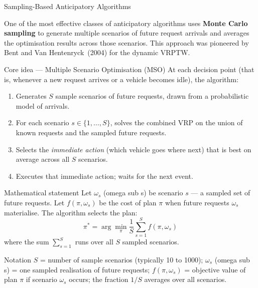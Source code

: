 \documentclass[aspectratio=169,10pt]{beamer}
\begin{document}
\begin{frame}[allowframebreaks]{Sampling-Based Anticipatory Algorithms}

  One of the most effective classes of anticipatory algorithms uses
  \textbf{Monte Carlo sampling} to generate multiple scenarios of future
  request arrivals and averages the optimisation results across those scenarios.
  This approach was pioneered by Bent and Van Hentenryck~(2004) for the
  dynamic VRPTW.

  \begin{block}{Core idea — Multiple Scenario Optimisation (MSO)}
    At each decision point (that is, whenever a new request arrives or a
    vehicle becomes idle), the algorithm:
    \begin{enumerate}
      \item Generates $S$ sample scenarios of future requests, drawn from
            a probabilistic model of arrivals.
      \item For each scenario $s \in \{1, \ldots, S\}$, solves the combined
            VRP on the union of known requests and the sampled future requests.
      \item Selects the \emph{immediate action} (which vehicle goes where next)
            that is best on average across all $S$ scenarios.
      \item Executes that immediate action; waits for the next event.
    \end{enumerate}
  \end{block}

  \begin{block}{Mathematical statement}
    Let $\omega_s$ (omega sub s) be scenario $s$ — a sampled set of future
    requests.  Let $f(\pi, \omega_s)$ be the cost of plan $\pi$ when future
    requests $\omega_s$ materialise.  The algorithm selects the plan:
    \[
      \pi^* = \arg\min_{\pi} \frac{1}{S} \sum_{s=1}^{S} f(\pi, \omega_s)
    \]
    where the sum $\sum_{s=1}^{S}$ runs over all $S$ sampled scenarios.
  \end{block}

  \begin{block}{Notation}
    $S$ = number of sample scenarios (typically 10 to 1000); $\omega_s$
    (omega sub s) = one sampled realisation of future requests;
    $f(\pi, \omega_s)$ = objective value of plan $\pi$ if scenario $\omega_s$
    occurs; the fraction $1/S$ averages over all scenarios.
  \end{block}


\end{frame}
\end{document}
